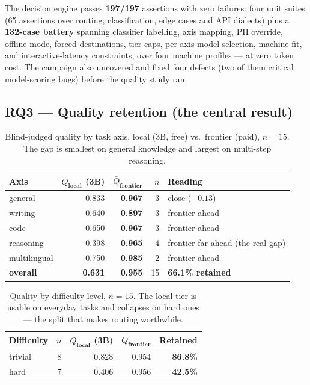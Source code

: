 \documentclass[10pt]{article} %
\begin{document}
The decision engine passes \textbf{197/197} assertions with zero failures: four unit suites (65 assertions over routing, classification, edge cases and API dialects) plus a \textbf{132-case battery} spanning classifier labelling, axis mapping, PII override, offline mode, forced destinations, tier caps, per-axis model selection, machine fit, and interactive-latency constraints, over four machine profiles --- at zero token cost. The campaign also uncovered and fixed four defects (two of them critical model-scoring bugs) before the quality study ran.

\subsection{RQ3 --- Quality retention (the central result)}
\label{sec:rq3}

\begin{table}[t]
\caption{Blind-judged quality by task axis, local (3B, free) vs.\ frontier (paid), $n{=}15$. The gap is smallest on general knowledge and largest on multi-step reasoning.}
\label{tab:axis}
\begin{center}
\begin{tabular}{lrrrl}
\toprule
\bf Axis & $\bar{Q}_{\textbf{local}}$ \bf (3B) & $\bar{Q}_{\textbf{frontier}}$ & $n$ & \bf Reading \\
\midrule
general      & 0.833 & \textbf{0.967} & 3 & close ($-0.13$) \\
writing      & 0.640 & \textbf{0.897} & 3 & frontier ahead \\
code         & 0.650 & \textbf{0.967} & 3 & frontier ahead \\
reasoning    & 0.398 & \textbf{0.965} & 4 & frontier far ahead (the real gap) \\
multilingual & 0.750 & \textbf{0.985} & 2 & frontier ahead \\
\midrule
\bf overall  & \bf 0.631 & \bf 0.955 & 15 & \bf 66.1\% retained \\
\bottomrule
\end{tabular}
\end{center}
\end{table}

\begin{table}[t]
\caption{Quality by difficulty level, $n{=}15$. The local tier is usable on everyday tasks and collapses on hard ones --- the split that makes routing worthwhile.}
\label{tab:difficulty}
\begin{center}
\begin{tabular}{lrrrr}
\toprule
\bf Difficulty & $n$ & $\bar{Q}_{\textbf{local}}$ \bf (3B) & $\bar{Q}_{\textbf{frontier}}$ & \bf Retained \\
\midrule
trivial & 8 & 0.828 & 0.954 & \textbf{86.8\%} \\
hard    & 7 & 0.406 & 0.956 & \textbf{42.5\%} \\
\bottomrule
\end{tabular}
\end{center}
\end{table}
\end{document}
